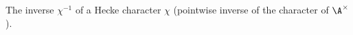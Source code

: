 The inverse $\chi^{-1}$ of a Hecke character $\chi$ (pointwise inverse of the character of $\A^\times$).
